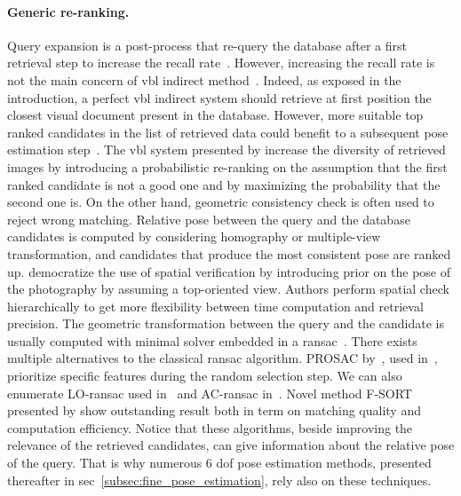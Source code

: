 \paragraph{Generic re-ranking.}
Query expansion is a post-process that re-query the database after a first retrieval step to increase the recall rate~\citep{Chum2007,Chum2011,Tolias2014}. However, increasing the recall rate is not the main concern of \ac{vbl} indirect method~\citep{Sattler2012}. Indeed, as exposed in the introduction, a perfect \ac{vbl} indirect system should retrieve at first position the closest visual document present in the database. However, more suitable top ranked candidates in the list of retrieved data could benefit to a subsequent pose estimation step~\citep{Song2016}. The \ac{vbl} system presented by \citet{Cao2013} increase the diversity of retrieved images by introducing a probabilistic re-ranking on the assumption that the first ranked candidate is not a good one and by maximizing the probability that the second one is.
\label{par:ransac}
On the other hand, geometric consistency check is often used to reject wrong matching. Relative pose between the query and the database candidates is computed by considering homography or multiple-view transformation, and candidates that produce the most consistent pose are ranked up. \citet{Philbin2007} democratize the use of spatial verification by introducing prior on the pose of the photography by assuming a top-oriented view. Authors perform spatial check hierarchically to get more flexibility between time computation and retrieval precision. The geometric transformation between the query and the candidate is usually computed with minimal solver embedded in a \ac{ransac}~\citep{Fischler1981}. There exists multiple alternatives to the classical \ac{ransac} algorithm. PROSAC by~\citep{Chum2005}, used in~\citep{Donoser2014}, prioritize specific features during the random selection step. We can also enumerate LO-\ac{ransac} used in~\citep{Philbin2007} and AC-\ac{ransac} in~\citep{Qu2015,Qu2016}. Novel method F-SORT presented by \citet{Chan2016} show outstanding result both in term on matching quality and computation efficiency. Notice that these algorithms, beside improving the relevance of the retrieved candidates, can give information about the relative pose of the query. That is why numerous 6 \ac{dof} pose estimation methods, presented thereafter in \acs{sec}~\ref{subsec:fine_pose_estimation}, rely also on these techniques.

